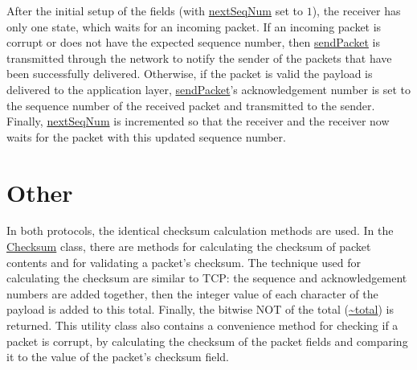 \documentclass[a4paper]{article}
\newcommand{\code}{\url}
\begin{document}
After the initial setup of the fields (with \code{nextSeqNum} set to $1$), the receiver has only one state, which waits for an incoming packet. If an incoming packet is corrupt or does not have the expected sequence number, then \code{sendPacket} is transmitted through the network to notify the sender of the packets that have been successfully delivered. Otherwise, if the packet is valid the payload is delivered to the application layer, \code{sendPacket}'s acknowledgement number is set to the sequence number of the received packet and transmitted to the sender. Finally, \code{nextSeqNum} is incremented so that the receiver and the receiver now waits for the packet with this updated sequence number.

\section{Other}

In both protocols, the identical checksum calculation methods are used. In the \code{Checksum} class, there are methods for calculating the checksum of packet contents and for validating a packet's checksum. The technique used for calculating the checksum are similar to TCP: the sequence and acknowledgement numbers are added together, then the integer value of each character of the payload is added to this total. Finally, the bitwise NOT of the total (\code{~total}) is returned. This utility class also contains a convenience method for checking if a packet is corrupt, by calculating the checksum of the packet fields and comparing it to the value of the packet's checksum field.
\end{document}
